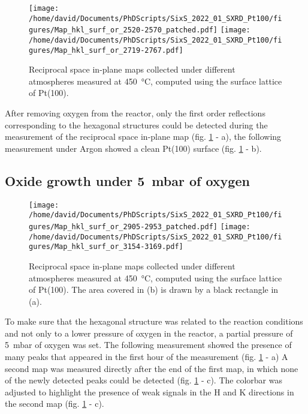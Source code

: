 \begin{figure}[!htb]
    \centering
    \texttt{[image: /home/david/Documents/PhDScripts/SixS\_2022\_01\_SXRD\_Pt100/figures/Map\_hkl\_surf\_or\_2520-2570\_patched.pdf]}
    \texttt{[image: /home/david/Documents/PhDScripts/SixS\_2022\_01\_SXRD\_Pt100/figures/Map\_hkl\_surf\_or\_2719-2767.pdf]}
    \caption{
        Reciprocal space in-plane maps collected under different atmospheres measured at \qty{450}{\degreeCelsius}, computed using the surface lattice of Pt(100).
    }
    \label{fig:MapsPt100C}
\end{figure}

After removing oxygen from the reactor, only the first order reflections corresponding to the hexagonal structures could be detected during the measurement of the reciprocal space in-plane map (fig. \ref{fig:MapsPt100C} - a), the following measurement under Argon showed a clean Pt(100) surface (fig. \ref{fig:MapsPt100C} - b).

\subsection{Oxide growth under \qty{5}{\milli\bar} of oxygen}

\begin{figure}[!htb]
    \centering
    \texttt{[image: /home/david/Documents/PhDScripts/SixS\_2022\_01\_SXRD\_Pt100/figures/Map\_hkl\_surf\_or\_2905-2953\_patched.pdf]}
    \texttt{[image: /home/david/Documents/PhDScripts/SixS\_2022\_01\_SXRD\_Pt100/figures/Map\_hkl\_surf\_or\_3154-3169.pdf]}
    \caption{
        Reciprocal space in-plane maps collected under different atmospheres measured at \qty{450}{\degreeCelsius}, computed using the surface lattice of Pt(100).
        The area covered in (b) is drawn by a black rectangle in (a).
    }
    \label{fig:MapsPt100D}
\end{figure}

To make sure that the hexagonal structure was related to the reaction conditions and not only to a lower pressure of oxygen in the reactor, a partial pressure of \qty{5}{\milli\bar} of oxygen was set.
The following measurement showed the presence of many peaks that appeared in the first hour of the measurement (fig. \ref{fig:MapsPt100C} - a)
A second map was measured directly after the end of the first map, in which none of the newly detected peaks could be detected (fig. \ref{fig:MapsPt100C} - c).
The colorbar was adjusted to highlight the presence of weak signals in the H and K directions in the second map (fig. \ref{fig:MapsPt100C} - c).

